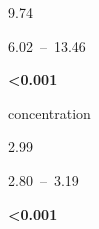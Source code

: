 \documentclass[
  letterpaper,
  DIV=11,
  numbers=noendperiod]{scrartcl}
\begin{document}
\begin{table}
\begin{minipage}[t]{\linewidth}
{\centering 

9.74

}

\end{minipage}%
\newline
\begin{minipage}[t]{\linewidth}

{\centering 

6.02~--~13.46

}

\end{minipage}%
\newline
\begin{minipage}[t]{\linewidth}

{\centering 

\textbf{\textless0.001}

}

\end{minipage}%
\newline
\begin{minipage}[t]{\linewidth}

{\centering 

concentration

}

\end{minipage}%
\newline
\begin{minipage}[t]{\linewidth}

{\centering 

2.99

}

\end{minipage}%
\newline
\begin{minipage}[t]{\linewidth}

{\centering 

2.80~--~3.19

}

\end{minipage}%
\newline
\begin{minipage}[t]{\linewidth}

{\centering 

\textbf{\textless0.001}

}

\end{minipage}%
\newline
\begin{minipage}[t]{\linewidth}

{\centering 

}
\end{minipage}
\end{table}
\end{document}

